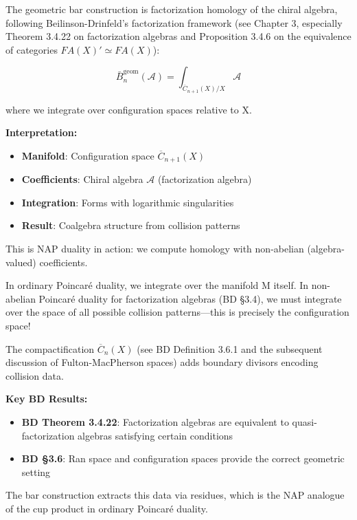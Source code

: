 \begin{framework}\label{framework:bar-fh}
The geometric bar construction is factorization homology of the chiral algebra, 
following Beilinson-Drinfeld's factorization framework (see \cite{BD04} Chapter 3, 
especially Theorem 3.4.22 on factorization algebras and Proposition 3.4.6 on the 
equivalence of categories $FA(X)' \simeq FA(X)$):

$$\bar{B}^{\text{geom}}_n(\mathcal{A}) = \int_{\overline{C}_{n+1}(X)/X} \mathcal{A}$$

where we integrate over configuration spaces relative to X.

\textbf{Interpretation:}
\begin{itemize}
\item \textbf{Manifold}: Configuration space $\overline{C}_{n+1}(X)$
\item \textbf{Coefficients}: Chiral algebra $\mathcal{A}$ (factorization algebra)
\item \textbf{Integration}: Forms with logarithmic singularities
\item \textbf{Result}: Coalgebra structure from collision patterns
\end{itemize}

This is NAP duality in action: we compute homology with non-abelian (algebra-valued) coefficients.
\end{framework}

\begin{remark}\label{rem:why-config-NAP}
In ordinary Poincaré duality, we integrate over the manifold M itself. In non-abelian 
Poincaré duality for factorization algebras (BD \S3.4), we must integrate over the 
space of all possible collision patterns—this is precisely the configuration space!

The compactification $\overline{C}_n(X)$ (see BD Definition 3.6.1 and the subsequent 
discussion of Fulton-MacPherson spaces) adds boundary divisors encoding collision data. 

\textbf{Key BD Results:}
\begin{itemize}
\item \textbf{BD Theorem 3.4.22}: Factorization algebras are equivalent to quasi-factorization algebras satisfying certain conditions
\item \textbf{BD §3.6}: Ran space and configuration spaces provide the correct geometric setting
\end{itemize}

The bar construction extracts this data via residues, which is the NAP analogue of 
the cup product in ordinary Poincaré duality.
\end{remark}

